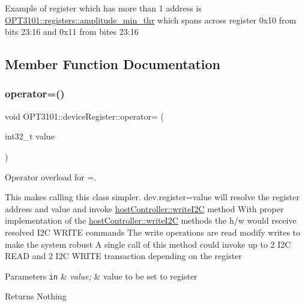  Example of register which has more than 1 address is \mbox{\hyperlink{class_o_p_t3101_1_1registers_abdb9db1e1ff8bda71eccaea718b116d0}{O\+P\+T3101\+::registers\+::amplitude\+\_\+min\+\_\+thr}} which spans across register 0x10 from bits 23\+:16 and 0x11 from bites 23\+:16 

\subsection{Member Function Documentation}
\mbox{\label{class_o_p_t3101_1_1device_register_a0b3153b2ccbe96d37c247c605d6ba995}} 
\subsubsection{\texorpdfstring{operator=()}{operator=()}}
{\footnotesize\ttfamily void O\+P\+T3101\+::device\+Register\+::operator= (\begin{DoxyParamCaption}\item[{int32\+\_\+t}]{value }\end{DoxyParamCaption})}



Operator overload for \textquotesingle{}=\textquotesingle{}. 

This makes calling this class simpler. dev.\+register=value will resolve the register address and value and invoke \mbox{\hyperlink{classhost_controller_a7c4126810a72333e3ebe749159a0a516}{host\+Controller\+::write\+I2C}} method With proper implementation of the \mbox{\hyperlink{classhost_controller_a7c4126810a72333e3ebe749159a0a516}{host\+Controller\+::write\+I2C}} methods the h/w would receive resolved I2C W\+R\+I\+TE commands The write operations are read modify writes to make the system robust A single call of this method could invoke up to 2 I2C R\+E\+AD and 2 I2C W\+R\+I\+TE transaction depending on the register 
\begin{DoxyParams}[1]{Parameters}
\mbox{\tt in}  & {\em value;} & value to be set to register \\
\hline
\end{DoxyParams}
\begin{DoxyReturn}{Returns}
Nothing 
\end{DoxyReturn}
\mbox{\label{class_o_p_t3101_1_1device_register_a78bf911477c1d96731b716db7ea83dcb}} 
